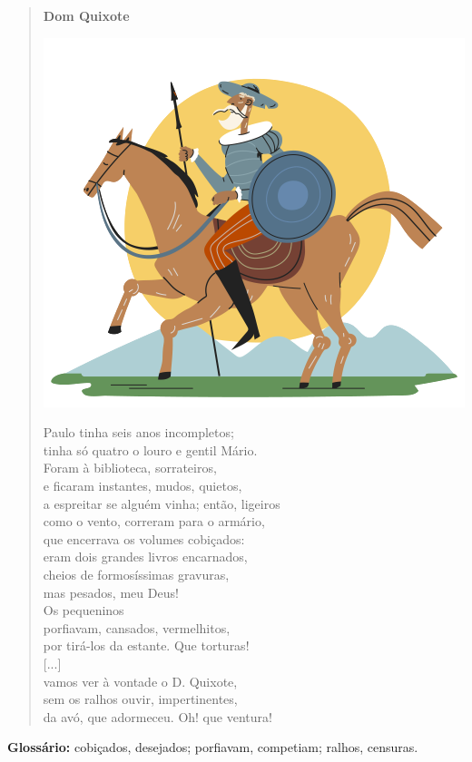\begin{myquote}
\begin{verse}
\textbf{Dom Quixote}

\begin{center}
\includegraphics[width=.5\textwidth]{media/image40.png}
\end{center}

Paulo tinha seis anos incompletos;\\
tinha só quatro o louro e gentil Mário.\\
Foram à biblioteca, sorrateiros,\\
e ficaram instantes, mudos, quietos,\\
a espreitar se alguém vinha; então, ligeiros\\
como o vento, correram para o armário,\\
que encerrava os volumes cobiçados:\\
eram dois grandes livros encarnados,\\
cheios de formosíssimas gravuras,\\
mas pesados, meu Deus!\\
Os pequeninos\\
porfiavam, cansados, vermelhitos,\\
por tirá-los da estante. Que torturas!\\
{[}...{]}\\
vamos ver à vontade o D. Quixote,\\
sem os ralhos ouvir, impertinentes,\\
da avó, que adormeceu. Oh! que ventura!
\end{verse}


\begin{small}
\textbf{Glossário:} cobiçados, desejados; porfiavam, competiam; ralhos, censuras.
\end{small}
\end{myquote}

